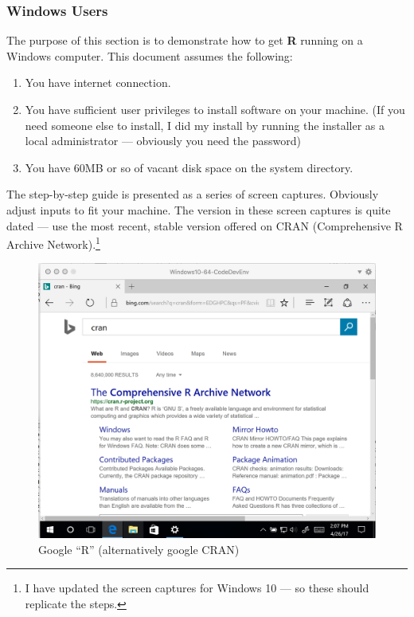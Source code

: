 \subsubsection{Windows Users}
The purpose of this section is to demonstrate how to get \textbf{R} running on a Windows computer.  This document assumes the following:
\begin{enumerate}
\item You have internet connection.
\item You have sufficient user privileges to install software on your machine.  (If you need someone else to install, I did my install by running the installer as a local administrator --- obviously you need the password)
\item You have 60MB or so of vacant disk space on the system directory.
\end{enumerate}

The step-by-step guide is presented as a series of screen captures.  Obviously adjust inputs to fit your machine.  The version in these screen captures is quite dated --- use the most recent, stable version offered on CRAN (Comprehensive R Archive Network).\footnote{I have updated the screen captures for Windows 10 --- so these should replicate the steps.}


\begin{figure}[h!] %
   \centering
   \includegraphics[width=4.5in]{./1-Introduction/googleR.jpg} 
   \caption{Google ``R'' (alternatively google CRAN)}
\end{figure}


